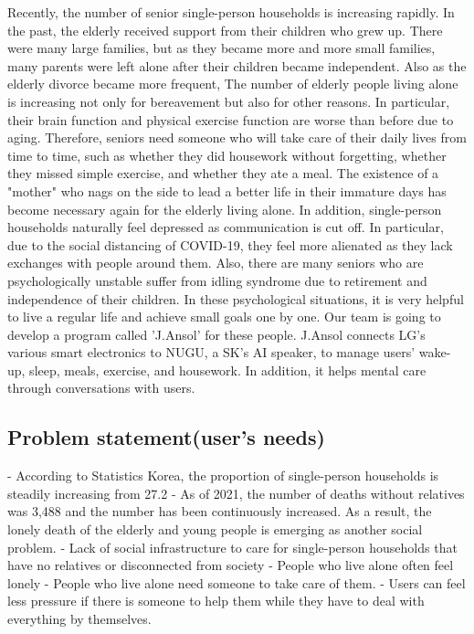 \documentclass[conference]{IEEEtran}
\begin{document}
Recently, the number of senior  single-person households is increasing rapidly. In the past, the elderly received support from their children who grew up. There were many large  families, but as they became more and more small families, many parents were left alone after their children became independent. Also as the elderly divorce became more frequent, The number of elderly people living alone is increasing not only for bereavement but also for other reasons.
\newline
In particular, their brain function and physical exercise function are worse than before due to aging. Therefore, seniors need someone who will take care of their daily lives from time to time, such as whether they did housework without forgetting, whether they missed simple exercise, and whether they ate a meal. The existence of a "mother" who nags on the side to lead a better life in their immature days has become necessary again for the elderly living alone.
\newline
In addition, single-person households naturally feel depressed as communication is cut off. In particular, due to the social distancing of COVID-19, they feel more alienated as they lack exchanges with people around them. Also, there are many seniors who are psychologically unstable suffer from idling syndrome due to retirement  and independence of their children. In these psychological situations, it is very helpful to live a regular life and achieve small goals one by one.
\newline
Our team is going to develop a program called 'J.Ansol' for these people. J.Ansol connects LG's various smart electronics to NUGU, a SK’s AI speaker, to manage users' wake-up, sleep, meals, exercise, and housework. In addition, it helps mental care through conversations with users.


\subsection{Problem statement(user's needs)}

- According to Statistics Korea, the proportion of single-person households is steadily increasing from 27.2%
\newline
\newline
- As of 2021, the number of deaths without relatives was 3,488 and the number has been continuously increased. As a result, the lonely death of the elderly and young people is emerging as another social problem.
\newline
\newline
- Lack of social infrastructure to care for single-person households that have no relatives or disconnected from society
\newline
\newline
- People who live alone often feel lonely
\newline
\newline
- People who live alone need someone to take care of them.
\newline
\newline
- Users can feel less pressure if there is someone to help them while they have to deal with everything by themselves.
\end{document}
